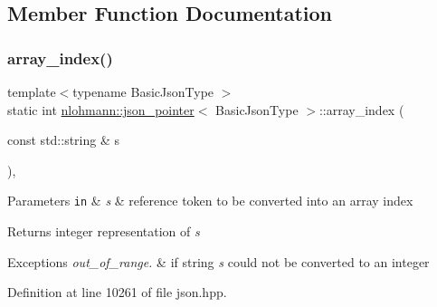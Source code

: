 \subsection{Member Function Documentation}
\mbox{\label{classnlohmann_1_1json__pointer_ac53f5b79dd91da78743c437832f57ce4}} 
\subsubsection{\texorpdfstring{array\+\_\+index()}{array\_index()}}
{\footnotesize\ttfamily template$<$typename Basic\+Json\+Type $>$ \\
static int \hyperlink{classnlohmann_1_1json__pointer}{nlohmann\+::json\+\_\+pointer}$<$ Basic\+Json\+Type $>$\+::array\+\_\+index (\begin{DoxyParamCaption}\item[{const std\+::string \&}]{s }\end{DoxyParamCaption})\hspace{0.3cm}{\ttfamily [inline]}, {\ttfamily [static]}}


\begin{DoxyParams}[1]{Parameters}
\mbox{\tt in}  & {\em s} & reference token to be converted into an array index\\
\hline
\end{DoxyParams}
\begin{DoxyReturn}{Returns}
integer representation of {\itshape s} 
\end{DoxyReturn}

\begin{DoxyExceptions}{Exceptions}
{\em out\+\_\+of\+\_\+range.} & if string {\itshape s} could not be converted to an integer \\
\hline
\end{DoxyExceptions}


Definition at line 10261 of file json.\+hpp.

\mbox{\label{classnlohmann_1_1json__pointer_ae9015c658f99cf3d48a8563accc79988}} 
